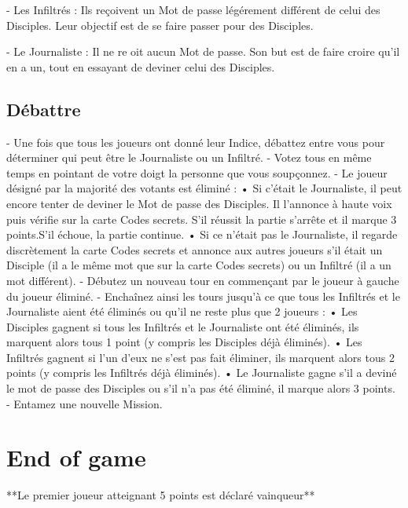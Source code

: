 \documentclass{article}%
\begin{document}
%
{-} Les Infiltrés : Ils reçoivent un Mot de passe légérement différent de celui des Disciples. Leur objectif est de se faire passer pour des Disciples.
%

%
{-} Le Journaliste : Il ne re oit aucun Mot de passe. Son but est de faire croire qu'il en a un, tout en essayant de deviner celui des Disciples.
%



%
\subsection{ Débattre
}%
\label{subsec:Dbattre}%

%
{-} Une fois que tous les joueurs ont donné leur Indice, débattez entre vous pour déterminer qui peut être le Journaliste ou un Infiltré.
%
{-} Votez tous en même temps en pointant de votre doigt la personne que vous soupçonnez.
%
{-} Le joueur désigné par la majorité des votants est éliminé :
%
• Si c’était le Journaliste, il peut encore tenter de deviner le Mot de passe des Disciples. Il l'annonce à haute voix puis vérifie sur la carte Codes secrets. S’il réussit la partie s’arrête et il marque 3 points.S’il échoue, la partie continue.
%
• Si ce n’était pas le Journaliste, il regarde discrètement la carte Codes secrets et annonce aux autres joueurs s’il était un Disciple (il a le même mot que sur la carte Codes secrets) ou un Infiltré (il a un mot différent).
%
{-} Débutez un nouveau tour en commençant par le joueur à gauche du joueur éliminé.
%
{-} Enchaînez ainsi les tours jusqu’à ce que tous les Infiltrés et le Journaliste aient été éliminés ou qu’il ne reste plus que 2 joueurs :
%
• Les Disciples gagnent si tous les Infiltrés et le Journaliste ont été éliminés, ils marquent alors tous 1 point (y compris
%
les Disciples déjà éliminés).
%
• Les Infiltrés gagnent si l'un d'eux ne s'est pas fait éliminer, ils marquent alors tous 2 points (y compris les Infiltrés déjà éliminés).
%
• Le Journaliste gagne s'il a deviné le mot de passe des Disciples ou s'il n'a pas été éliminé, il marque alors 3 points.
%
{-} Entamez une nouvelle Mission.
%



%
\section{ End of game
}%
\label{sec:Endofgame}%
**Le premier joueur atteignant 5 points est déclaré vainqueur**

%
\end{document}
